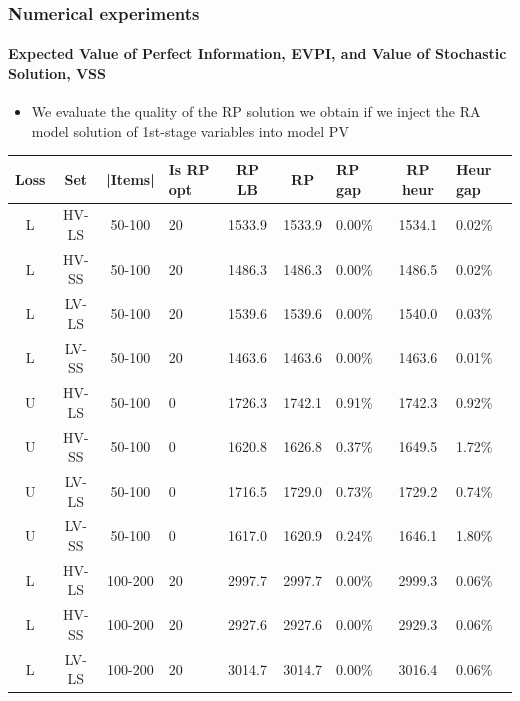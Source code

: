 \documentclass[,9pt,xcolor={dvipsnames}]{beamer} %
\begin{document}
\begin{frame}%
	\frametitle{Numerical experiments}
	\framesubtitle{Expected Value of Perfect Information, EVPI, and Value of Stochastic Solution, VSS}
	\begin{itemize}
		\footnotesize
		\item We evaluate the quality of the RP solution we obtain if we inject the RA model solution of 1st-stage variables into model PV
	\end{itemize}
	\begin{table}[h!]
		\centering
		\footnotesize
		\begin{tabular}{c c c f c c f c j}
			\hline
			Loss &
			Set & 
			|Items| &
			Is RP opt & RP LB & RP & RP gap & RP heur & Heur gap \\			
			\hline
			L & HV-LS & 50-100 & 20 & 1533.9 & 1533.9 & 0.00\% & 1534.1 & 0.02\% \\
			L & HV-SS & 50-100 & 20 & 1486.3 & 1486.3 & 0.00\% & 1486.5 & 0.02\% \\
			L & LV-LS & 50-100 & 20 & 1539.6 & 1539.6 & 0.00\% & 1540.0 & 0.03\% \\
			L & LV-SS & 50-100 & 20 & 1463.6 & 1463.6 & 0.00\% & 1463.6 & 0.01\% \\
			\hline
			U & HV-LS & 50-100 & 0 & 1726.3 & 1742.1 & 0.91\% & 1742.3 & 0.92\% \\
			U & HV-SS & 50-100 & 0 & 1620.8 & 1626.8 & 0.37\% & 1649.5 & 1.72\% \\
			U & LV-LS & 50-100 & 0 & 1716.5 & 1729.0 & 0.73\% & 1729.2 & 0.74\% \\
			U & LV-SS & 50-100 & 0 & 1617.0 & 1620.9 & 0.24\% & 1646.1 & 1.80\% \\
			\hline
			L & HV-LS & 100-200 & 20 & 2997.7 & 2997.7 & 0.00\% & 2999.3 & 0.06\% \\
			L & HV-SS & 100-200 & 20 & 2927.6 & 2927.6 & 0.00\% & 2929.3 & 0.06\% \\
			L & LV-LS & 100-200 & 20 & 3014.7 & 3014.7 & 0.00\% & 3016.4 & 0.06\% \\

\end{tabular}
\end{table}
\end{frame}
\end{document}
